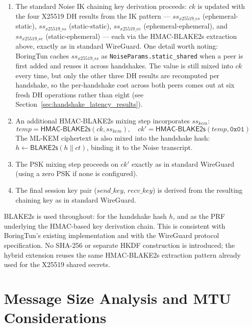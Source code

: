 \begin{enumerate}
    \item The standard Noise IK chaining key derivation proceeds: $\mathit{ck}$ is updated with the four X25519 DH results from the IK pattern --- $\mathit{ss}_\mathit{x25519\_es}$ (ephemeral-static), $\mathit{ss}_\mathit{x25519\_ss}$ (static-static), $\mathit{ss}_\mathit{x25519\_ee}$ (ephemeral-ephemeral), and $\mathit{ss}_\mathit{x25519\_se}$ (static-ephemeral) --- each via the HMAC-BLAKE2s extraction above, exactly as in standard WireGuard. One detail worth noting: BoringTun caches $\mathit{ss}_\mathit{x25519\_ss}$ as \texttt{NoiseParams.static\_shared} when a peer is first added and reuses it across handshakes. The value is still mixed into $\mathit{ck}$ every time, but only the other three DH results are recomputed per handshake, so the per-handshake cost across both peers comes out at six fresh DH operations rather than eight (see Section~\ref{sec:handshake_latency_results}).

    \item An additional HMAC-BLAKE2s mixing step incorporates $\mathit{ss}_\mathit{kem}$:
    \[
        \mathit{temp} = \mathsf{HMAC\text{-}BLAKE2s}(\mathit{ck}, \mathit{ss}_\mathit{kem}), \quad
        \mathit{ck}' = \mathsf{HMAC\text{-}BLAKE2s}(\mathit{temp}, \mathtt{0x01})
    \]
    The ML-KEM ciphertext is also mixed into the handshake hash: $h \leftarrow \mathsf{BLAKE2s}(h \| \mathit{ct})$, binding it to the Noise transcript.

    \item The PSK mixing step proceeds on $\mathit{ck}'$ exactly as in standard WireGuard (using a zero PSK if none is configured).

    \item The final session key pair ($\mathit{send\_key}$, $\mathit{recv\_key}$) is derived from the resulting chaining key as in standard WireGuard.
\end{enumerate}

BLAKE2s is used throughout: for the handshake hash $h$, and as the PRF underlying the HMAC-based key derivation chain. This is consistent with BoringTun's existing implementation and with the WireGuard protocol specification. No SHA-256 or separate HKDF construction is introduced; the hybrid extension reuses the same HMAC-BLAKE2s extraction pattern already used for the X25519 shared secrets.

\section{Message Size Analysis and MTU Considerations}

